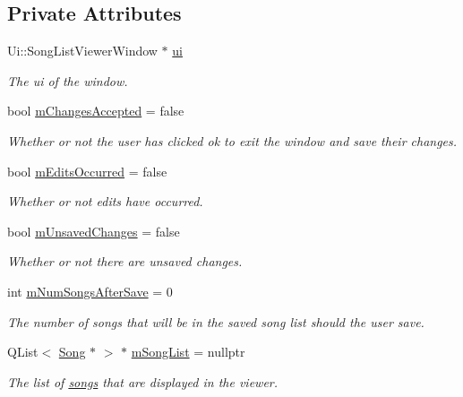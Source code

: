 \subsection*{Private Attributes}
\begin{DoxyCompactItemize}
\item 
Ui\+::\+Song\+List\+Viewer\+Window $\ast$ \mbox{\hyperlink{class_song_list_viewer_window_ac24fa09133b92a7b4cbd757f9b84258d}{ui}}
\begin{DoxyCompactList}\small\item\em The ui of the window. \end{DoxyCompactList}\item 
bool \mbox{\hyperlink{class_song_list_viewer_window_aa8fcb59a0ed81ec14c6ac611e1812c08}{m\+Changes\+Accepted}} = false
\begin{DoxyCompactList}\small\item\em Whether or not the user has clicked ok to exit the window and save their changes. \end{DoxyCompactList}\item 
bool \mbox{\hyperlink{class_song_list_viewer_window_a939acaa75e8260232852266a5891fb5f}{m\+Edits\+Occurred}} = false
\begin{DoxyCompactList}\small\item\em Whether or not edits have occurred. \end{DoxyCompactList}\item 
bool \mbox{\hyperlink{class_song_list_viewer_window_a150efbd08beb368c4acc65621d03d35d}{m\+Unsaved\+Changes}} = false
\begin{DoxyCompactList}\small\item\em Whether or not there are unsaved changes. \end{DoxyCompactList}\item 
int \mbox{\hyperlink{class_song_list_viewer_window_a92cc7fd927ce7dc144f0febb0fdfa434}{m\+Num\+Songs\+After\+Save}} = 0
\begin{DoxyCompactList}\small\item\em The number of songs that will be in the saved song list should the user save. \end{DoxyCompactList}\item 
Q\+List$<$ \mbox{\hyperlink{class_song}{Song}} $\ast$ $>$ $\ast$ \mbox{\hyperlink{class_song_list_viewer_window_a02558cb095f356a1288e5663bc2e1955}{m\+Song\+List}} = nullptr
\begin{DoxyCompactList}\small\item\em The list of \mbox{\hyperlink{class_song}{songs}} that are displayed in the viewer. \end{DoxyCompactList}\item 

\end{DoxyCompactItemize}
